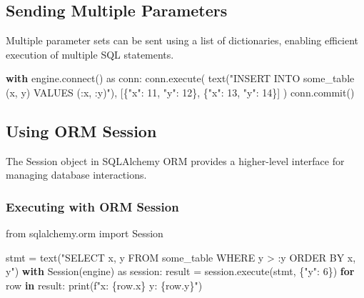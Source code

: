 \documentclass[
  letterpaper,
  DIV=11,
  numbers=noendperiod]{scrreprt}
\newenvironment{Shaded}{\begin{snugshade}}{\end{snugshade}}
\newcommand{\BuiltInTok}[1]{\textcolor[rgb]{0.00,0.23,0.31}{#1}}
\newcommand{\ControlFlowTok}[1]{\textcolor[rgb]{0.00,0.23,0.31}{\textbf{#1}}}
\newcommand{\DecValTok}[1]{\textcolor[rgb]{0.68,0.00,0.00}{#1}}
\newcommand{\ExtensionTok}[1]{\textcolor[rgb]{0.00,0.23,0.31}{#1}}
\newcommand{\ImportTok}[1]{\textcolor[rgb]{0.00,0.46,0.62}{#1}}
\newcommand{\KeywordTok}[1]{\textcolor[rgb]{0.00,0.23,0.31}{\textbf{#1}}}
\newcommand{\NormalTok}[1]{\textcolor[rgb]{0.00,0.23,0.31}{#1}}
\newcommand{\OperatorTok}[1]{\textcolor[rgb]{0.37,0.37,0.37}{#1}}
\newcommand{\SpecialCharTok}[1]{\textcolor[rgb]{0.37,0.37,0.37}{#1}}
\newcommand{\SpecialStringTok}[1]{\textcolor[rgb]{0.13,0.47,0.30}{#1}}
\newcommand{\StringTok}[1]{\textcolor[rgb]{0.13,0.47,0.30}{#1}}
\begin{document}
\subsection{Sending Multiple
Parameters}\label{sending-multiple-parameters}

Multiple parameter sets can be sent using a list of dictionaries,
enabling efficient execution of multiple SQL statements.

\begin{Shaded}
\begin{Highlighting}[]
\ControlFlowTok{with}\NormalTok{ engine.}\ExtensionTok{connect}\NormalTok{() }\ImportTok{as}\NormalTok{ conn:}
\NormalTok{    conn.execute(}
\NormalTok{        text(}\StringTok{"INSERT INTO some\_table (x, y) VALUES (:x, :y)"}\NormalTok{),}
\NormalTok{        [\{}\StringTok{"x"}\NormalTok{: }\DecValTok{11}\NormalTok{, }\StringTok{"y"}\NormalTok{: }\DecValTok{12}\NormalTok{\}, \{}\StringTok{"x"}\NormalTok{: }\DecValTok{13}\NormalTok{, }\StringTok{"y"}\NormalTok{: }\DecValTok{14}\NormalTok{\}]}
\NormalTok{    )}
\NormalTok{    conn.commit()}
\end{Highlighting}
\end{Shaded}

\subsection{Using ORM Session}\label{using-orm-session}

The Session object in SQLAlchemy ORM provides a higher-level interface
for managing database interactions.

\subsubsection{Executing with ORM
Session}\label{executing-with-orm-session}

\begin{Shaded}
\begin{Highlighting}[]
\ImportTok{from}\NormalTok{ sqlalchemy.orm }\ImportTok{import}\NormalTok{ Session}

\NormalTok{stmt }\OperatorTok{=}\NormalTok{ text(}\StringTok{"SELECT x, y FROM some\_table WHERE y \textgreater{} :y ORDER BY x, y"}\NormalTok{)}
\ControlFlowTok{with}\NormalTok{ Session(engine) }\ImportTok{as}\NormalTok{ session:}
\NormalTok{    result }\OperatorTok{=}\NormalTok{ session.execute(stmt, \{}\StringTok{"y"}\NormalTok{: }\DecValTok{6}\NormalTok{\})}
    \ControlFlowTok{for}\NormalTok{ row }\KeywordTok{in}\NormalTok{ result:}
        \BuiltInTok{print}\NormalTok{(}\SpecialStringTok{f"x: }\SpecialCharTok{\{}\NormalTok{row}\SpecialCharTok{.}\NormalTok{x}\SpecialCharTok{\}}\SpecialStringTok{  y: }\SpecialCharTok{\{}\NormalTok{row}\SpecialCharTok{.}\NormalTok{y}\SpecialCharTok{\}}\SpecialStringTok{"}\NormalTok{)}
\end{Highlighting}
\end{Shaded}
\end{document}
